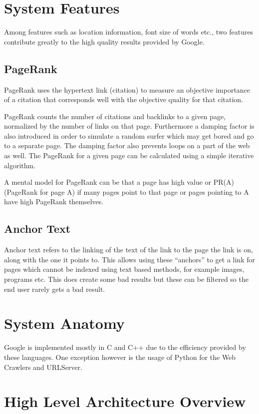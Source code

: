 \documentclass[10pt,a4paper]{article}
\begin{document}
\section{System Features}

Among features such as location information, font size of words etc., two features contribute greatly to the high quality results provided by Google.

\subsection{PageRank}

PageRank uses the hypertext link (citation) to measure an objective importance of a citation that corresponds well with the objective quality for that citation.

PageRank counts the number of citations and backlinks to a given page, normalized by the number of links on that page. Furthermore a damping factor is also introduced in order to simulate a random surfer which may get bored and go to a separate page. The damping factor also prevents loops on a part of the web as well. The PageRank for a given page can be calculated using a simple iterative algorithm.

A mental model for PageRank can be that a page has high value or PR(A) (PageRank for page A) if many pages point to that page or pages pointing to A have high PageRank themselves.

\subsection{Anchor Text}

Anchor text refers to the linking of the text of the link to the page the link is on, along with the one it points to. This allows using these ``anchors'' to get a link for pages which cannot be indexed using text based methods, for example images, programs etc. This does create some bad results but these can be filtered so the end user rarely gets a bad result.

\section{System Anatomy}

Google is implemented mostly in C and C++ due to the efficiency provided by these languages. One exception however is the usage of Python for the Web Crawlers and URLServer.

\section{High Level Architecture Overview}
\end{document}
